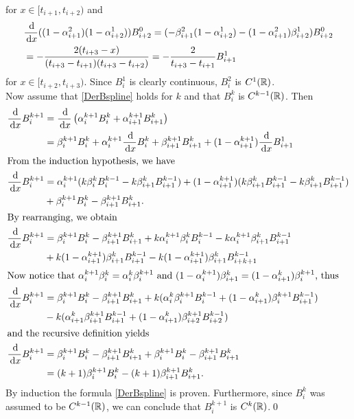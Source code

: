 for $x\in [t_{i+1},t_{i+2})$ and
\begin{align}
  &\frac{\,{\rm d}}{\,{\rm d} x} ((1-\alpha_{i+1}^2)(1-\alpha_{i+2}^1))B_{i+2}^0 = (-\beta_{i+1}^2(1-\alpha_{i+2}^1) -(1-\alpha_{i+1}^2)\beta_{i+2}^1)B_{i+2}^0\\
  &= - \frac{2(t_{i+3}-x)}{(t_{i+3}-t_{i+1})(t_{i+3}-t_{i+2})} = -\frac{2}{t_{i+3}-t_{i+1}}B_{i+1}^1
\end{align}
for $x\in [t_{i+2},t_{i+3})$. Since $B_i^1$ is clearly continuous, $B_i^2$ is $C^{1}(\mathbb R)$.\\

Now assume that \eqref{DerBspline} holds for $k$ and that $B_i^k$ is $C^{k-1}(\mathbb R)$. Then 
\begin{align}
  \frac{\,{\rm d}}{\,{\rm d} x} B_i^{k+1} &= \frac{\,{\rm d}}{\,{\rm d} x} \left(\alpha_i^{k+1} B_i^k + \alpha_{i+1}^{k+1}B_{i+1}^k\right)\\
  &= \beta_i^{k+1} B_i^k + \alpha_i^{k+1} \frac{\,{\rm d}}{\,{\rm d} x}B_i^k + \beta_{i+1}^{k+1} B_{i+1}^k + (1-\alpha_{i+1}^{k+1}) \frac{\,{\rm d}}{\,{\rm d} x}B_{i+1}^1\\
  \intertext{From the induction hypothesis, we have}
  \frac{\,{\rm d}}{\,{\rm d} x} B_i^{k+1} &= \alpha_i^{k+1}(k\beta_i^{k}B_i^{k-1} - k\beta_{i+1}^{k}B_{i+1}^{k-1}) + (1-\alpha_{i+1}^{k+1})(k\beta_{i+1}^{k}B_{i+1}^{k-1} - k\beta_{i+1}^k B_{i+1}^{k-1})\\
  &+ \beta_i^{k+1}B_i^k - \beta_{i+1}^{k+1}B_{i+1}^k.\\
  \intertext{By rearranging, we obtain}
  \frac{\,{\rm d}}{\,{\rm d} x} B_i^{k+1} &= \beta_i^{k+1} B_i^k - \beta_{i+1}^{k+1}B_{i+1}^k + k\alpha_i^{k+1}\beta_i^kB_i^{k-1} - k\alpha_i^{k+1}\beta_{i+1}^kB_{i+1}^{k-1}\\
  &+ k(1-\alpha_{i+1}^{k+1})\beta_{i+1}^kB_{i+1}^{k-1} - k(1-\alpha_{i+1}^{k+1})\beta_{i+1}^kB_{i+{k+1}}^{k-1}\\
  \intertext{Now notice that $\alpha_i^{k+1}\beta_i^{k} = \alpha_i^{k}\beta_i^{k+1}$ and $(1-\alpha_i^{k+1})\beta_{i+1}^{k} = (1-\alpha_{i+1}^{k})\beta_{i}^{k+1}$, thus}
  \frac{\,{\rm d}}{\,{\rm d} x} B_i^{k+1} &= \beta_i^{k+1} B_i^k - \beta_{i+1}^{k+1}B_{i+1}^k + k(\alpha_i^k\beta_i^{k+1}B_i^{k-1} + (1-\alpha_{i+1}^k)\beta_{i}^{k+1}B_{i+1}^{k-1})\\
  &- k(\alpha_{i+1}^k\beta_{i+1}^{k+1}B_{i+1}^{k-1} + (1-\alpha_{i+1}^k)\beta_{i+2}^{k+1}B_{i+2}^{k-1})\\
  \intertext{and the recursive definition yields}
  \frac{\,{\rm d}}{\,{\rm d} x} B_i^{k+1} &= \beta_i^{k+1} B_i^k - \beta_{i+1}^{k+1}B_{i+1}^k + \beta_{i}^{k+1}B_i^k - \beta_{i+1}^{k+1} B_{i+1}^k\\
  &= (k+1)\beta_{i}^{k+1}B_i^k - (k+1)\beta_{i+1}^{k+1} B_{i+1}^k.
\end{align}
By induction the formula \eqref{DerBspline} is proven. Furthermore, since $B_i^k$ was assumed to be $C^{k-1}(\mathbb R)$, we can conclude that $B_i^{k+1}$ is $C^k(\mathbb R)$.\hfill\qed\\

